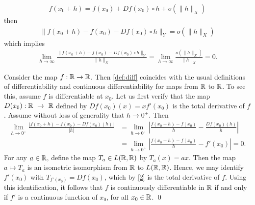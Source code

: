 \begin{framed}
\begin{remark}
    \begin{equation*}
    \begin{split}
      f(x_{0} + h) = f(x_{0}) + Df(x_{0}) \circ h + o(\| h \|_{X})
    \end{split}
    \end{equation*}
    then
    \begin{equation*}
    \begin{split}
      \| f(x_{0} + h) - f(x_{0}) - Df(x_{0}) \circ h \|_{Y} = o(\| h
      \|_{X})
    \end{split}
    \end{equation*}
    which implies
    \begin{equation*}
    \begin{split}
      \lim_{h \to \infty} \frac{\| f(x_{0} + h) - f(x_{0}) - Df(x_{0}) \circ h
      \|_{Y}}{\| h \|_{X}}  = \lim_{h \to \infty} \frac{o(\| h \|_{X})}{\| h
      \|_{X}} = 0.
    \end{split}
    \end{equation*}
  \label{rem:equiv-def}
  \end{remark}
  \end{framed}
  \begin{framed}
	\begin{remark}
		\label{rem:usual-diff}
		Consider the map $f: \mathbb{R} \to \mathbb{R}$. Then \autoref{def:diff} 
		coincides with the usual definitions of
		differentiability and continuous differentiability for maps
		from $\mathbb{R} $ to $\mathbb{R}$.
		To see this, assume $f$ is differentiable at $x_0$.
		Let us first verify that the map  $D(x_0): \mathbb{R} ~\to~\mathbb{R}$
		defined by $Df(x_0)(x) =
		xf'(x_0)$ is the total derivative of $f$. Assume without loss of generality
		that $h \to 0^+$. Then
		\begin{equation}
			\label{2}
			\begin{split}
				 \lim_{h \to 0^+} \frac{| f( x_0 + h) - f(x_0) -
				Df(x_0)(h) |}{|h|}
				 & = \lim_{h\to 0^+} \left |\frac{f(x_0+h) -
				f(x_0)}{h} - \frac{Df(x_0)(h)}{h}  \right |
				\\
				 & =\lim_{h \to 0^+} \left |\frac{f(x_0+h) - f(x_0)}{h} -
				f'(x_0) \right | = 0.
			\end{split}
		\end{equation}
%
%
For any $a \in \mathbb{R}$, define the map $T_{a} \in L(\mathbb{R} , \mathbb{R})$ by
$T_{a}(x) = ax$. Then the map $a \mapsto T_a$ is an isometric
isomorphism from $\mathbb{R}$ to $L( \mathbb{R}, \mathbb{R})$. Hence, 
we may identify $f'(x_0)$ with $T_{f'(x_0)} = Df(x_0)$,
which by \eqref{2} is the total derivative of $f$.  Using this identification,
it follows that $f$ is continuously
differentiable in $\mathbb{R}$ if and only if $f'$ is a continuous function of
$x_0$, for all $x_0 \in \mathbb{R}$. \qed
%
\end{remark}
\end{framed}
